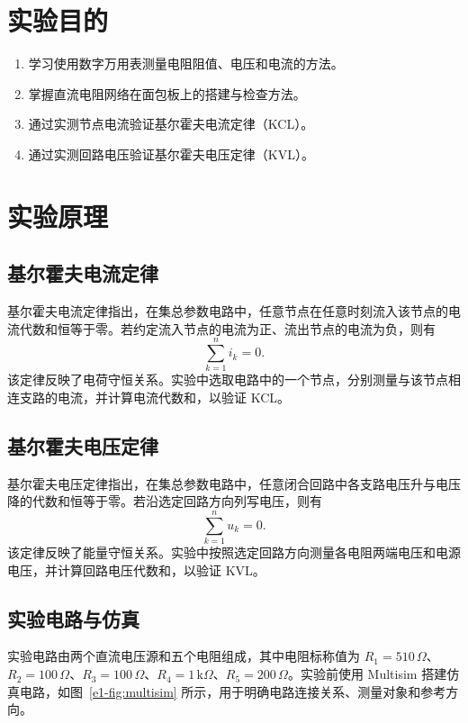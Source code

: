 \section{实验目的}

\begin{enumerate}[label=\arabic*.]
    \item 学习使用数字万用表测量电阻阻值、电压和电流的方法。
    \item 掌握直流电阻网络在面包板上的搭建与检查方法。
    \item 通过实测节点电流验证基尔霍夫电流定律（KCL）。
    \item 通过实测回路电压验证基尔霍夫电压定律（KVL）。
\end{enumerate}

\section{实验原理}

\subsection{基尔霍夫电流定律}

基尔霍夫电流定律指出，在集总参数电路中，任意节点在任意时刻流入该节点的电流代数和恒等于零。若约定流入节点的电流为正、流出节点的电流为负，则有
\begin{equation}
    \sum_{k=1}^{n} i_k = 0.
\end{equation}
该定律反映了电荷守恒关系。实验中选取电路中的一个节点，分别测量与该节点相连支路的电流，并计算电流代数和，以验证 KCL。

\subsection{基尔霍夫电压定律}

基尔霍夫电压定律指出，在集总参数电路中，任意闭合回路中各支路电压升与电压降的代数和恒等于零。若沿选定回路方向列写电压，则有
\begin{equation}
    \sum_{k=1}^{n} u_k = 0.
\end{equation}
该定律反映了能量守恒关系。实验中按照选定回路方向测量各电阻两端电压和电源电压，并计算回路电压代数和，以验证 KVL。

\subsection{实验电路与仿真}

实验电路由两个直流电压源和五个电阻组成，其中电阻标称值为 \(R_1=510\,\Omega\)、\(R_2=100\,\Omega\)、\(R_3=100\,\Omega\)、\(R_4=1\,\mathrm{k}\Omega\)、\(R_5=200\,\Omega\)。实验前使用 Multisim 搭建仿真电路，如图~\ref{e1-fig:multisim} 所示，用于明确电路连接关系、测量对象和参考方向。


